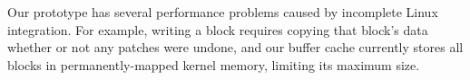 \begin{comment}
The Linux kernel must be modified in order to
provide support for \patchgroups.  As a kernel module, there is no way to
get notifications about when processes are created, or when they terminate; this
is necessary to clone the \patchgroup\ scope 
from the parent process when the process is created, and to release all
the \patchgroups\ when it terminates. Ordinarily, this sort of state would be kept
as part of the Linux \texttt{task\_struct} (i.e. process) structure, but this is
not a viable option for a dynamically loadable kernel module. Instead, the
\Kudos\ module keeps this state internally and uses new kernel hooks
to be notified when processes fork or exit. 

Our interfaces bypass all Linux caches, because \Kudos\ provides its own
\patch-aware caches (\S\ref{sec:modules:wbcache}) in order to provide its
write-ordering guarantees.

Our current implementation uses Linux's queuing structures for queuing I/O
requests for block devices. Although this is working, there are a couple subtle
problems that we would like to solve in a future version. For instance, we would
like to be able to give more priority to read requests, potentially even
reserving a SCSI TCQ or SATA NCQ command tag for reads only. In the current
implementation, read delay increases noticeably when there are many writes; we
suspect that a factor in this behavior is that the command tags are typically
all used for outstanding writes (since we request that the commands complete
only after the physical media has been written), while the Linux queues are
designed for a different situation: writes complete quickly (to the disk's
cache) and only reads take a long time.
\end{comment}

Our prototype has several performance problems caused by incomplete Linux
integration.
%
For example, writing a block requires copying that block's data
whether or not any patches were undone, and
%
our buffer cache currently
stores all blocks in permanently-mapped kernel memory,
limiting its maximum size.


\begin{comment}
We also observe that read delay increases notably when there are many
writes.
%
We suspect that write requests, which for \Kudos\ take far longer than
Linux expects because the drive must delay completion notification, are
using all available command slots; one or more slots should probably be
reserved for reads.
\end{comment}
